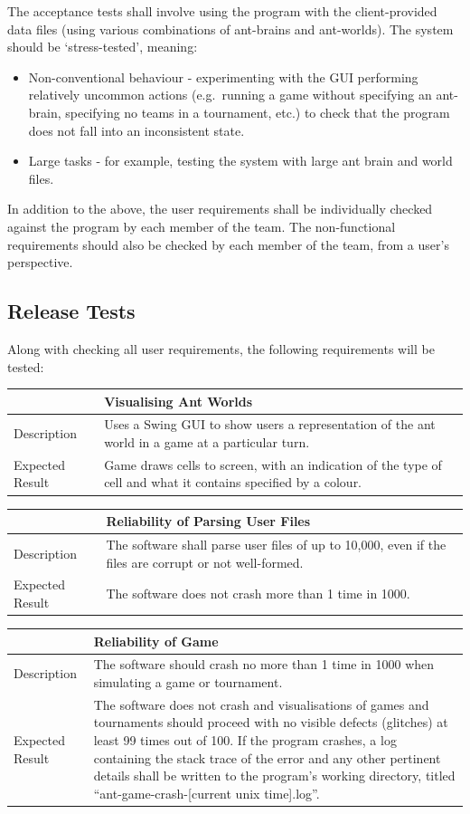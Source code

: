 \documentclass[11pt]{article}
\begin{document}
The acceptance tests shall involve using the program with the
client-provided data files (using various combinations of ant-brains and
ant-worlds). The system should be `stress-tested', meaning: 
\begin{itemize}
\item Non-conventional behaviour - experimenting with the GUI performing
relatively uncommon actions (e.g.~running a game without specifying an
ant-brain, specifying no teams in a tournament, etc.) to check that the
program does not fall into an inconsistent state.
\item Large tasks - for
example, testing the system with large ant brain and world files.
\end{itemize}
In addition to the above, the user requirements shall be individually
checked against the program by each member of the team. The
non-functional requirements should also be checked by each member of the
team, from a user's perspective.

\subsection{Release Tests}\label{gui}

Along with checking all user requirements, the following requirements will be tested:

\begin{longtable}[c]{@{}p{}p{}@{}}
\toprule
& Visualising Ant Worlds \tabularnewline
\midrule
Description & Uses a Swing GUI to show users a representation of the
ant world in a game at a particular turn.\tabularnewline
Expected Result & Game draws cells to
screen, with an indication of the type of cell and what it contains
specified by a colour.\tabularnewline
\bottomrule
\end{longtable}

\begin{longtable}[c]{@{}p{}p{}@{}}
\toprule
& Reliability of Parsing User Files \tabularnewline
\midrule
Description & The software shall parse user files of up to 10,000,
even if the files are corrupt or not well-formed.\tabularnewline
Expected Result & The software does not crash more than 1 time in 1000. \tabularnewline
\bottomrule
\end{longtable}

\begin{longtable}[c]{@{}p{}p{}@{}}
\toprule
& Reliability of Game \tabularnewline
\midrule
Description & The software should crash no more than 1 time in 1000
when simulating a game or tournament.\tabularnewline
Expected Result & The software does not crash and visualisations of games
and tournaments should proceed with no visible defects (glitches) at
least 99 times out of 100. If the program crashes, a log containing the
stack trace of the error and any other pertinent details shall be
written to the program's working directory, titled
``ant-game-crash-{[}current unix time{]}.log''. \tabularnewline
\bottomrule
\end{longtable}
\end{document}
